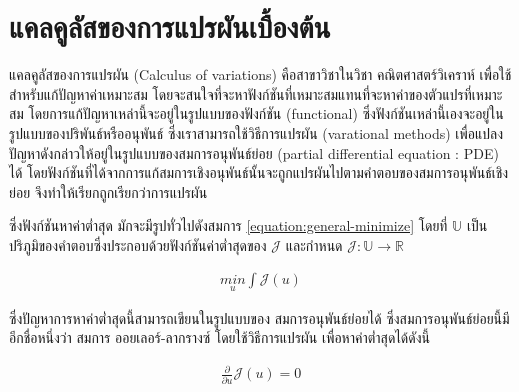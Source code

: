 \section{แคลคูลัสของการแปรผันเบื้องต้น}

\hspace{1cm} แคลคูลัสของการแปรผัน (Calculus of variations) คือสาขาวิชาในวิชา คณิตศาสตร์วิเคราห์ เพื่อใช้สำหรับแก้ปัญหาค่าเหมาะสม โดยจะสนใจที่จะหาฟังก์ชันที่เหมาะสมแทนที่จะหาค่าของตัวแปรที่เหมาะสม โดยการแก้ปัญหาเหล่านี้จะอยู่ในรูปแบบของฟังก์ชัน (functional) ซึ่งฟังก์ชันเหล่านี้เองจะอยู่ในรูปแบบของปริพันธ์หรืออนุพันธ์ ซึ่งเราสามารถใช้วิธีการแปรผัน (varational methods) เพื่อแปลงปัญหาดังกล่าวให้อยู่ในรูปแบบของสมการอนุพันธ์ย่อย (partial differential equation : PDE) ได้ โดยฟังก์ชันที่ได้จากการแก้สมการเชิงอนุพันธ์นั้นจะถูกแปรผันไปตามคำตอบของสมการอนุพันธ์เชิงย่อย จึงทำให้เรียกถูกเรียกว่าการแปรผัน

\hspace{1cm}ซึ่งฟังก์ชันหาค่าต่ำสุด มักจะมีรูปทั่วไปดังสมการ  \ref{equation:general-minimize} โดยที่ $\mathbb{U}$ เป็นปริภูมิของคำตอบซึ่งประกอบด้วยฟังก์ชันค่าต่ำสุดของ $\mathcal{J}$ และกำหนด $\mathcal{J} : \mathbb{U} \rightarrow  \mathbb{R} $

\begin{align}
    \underset{u}{{min}} \int \mathcal{J}(u)
    \label{equation:general-minimize}
\end{align}

\hspace{1cm} ซึ่งปัญหาการหาค่าต่ำสุดนี้สามารถเขียนในรูปแบบของ สมการอนุพันธ์ย่อยได้ ซึ่งสมการอนุพันธ์ย่อยนี้มีอีกชื่อหนึ่งว่า สมการ ออยเลอร์-ลากรางซ์ โดยใช้วิธีการแปรผัน เพื่อหาค่าต่ำสุดได้ดังนี้

\begin{align*}
    \frac{\partial }{\partial u } \mathcal{J}(u) = 0
\end{align*}